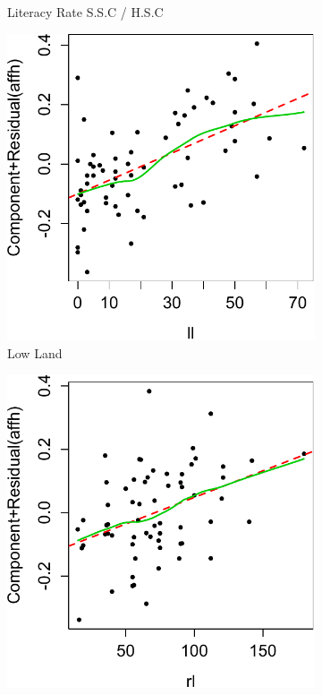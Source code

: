 \documentclass[preprint,review,12pt]{elsarticle}
\begin{document}
\begin{figure}[!htp]
\begin{subfigure}[t]{0.23\textwidth}
\caption{Literacy Rate S.S.C / H.S.C}
\end{subfigure}
\begin{subfigure}[t]{0.23\textwidth}
\centering
\includegraphics[width=\linewidth, keepaspectratio]{ll.pdf}
\caption{Low Land}
\end{subfigure}
\begin{subfigure}[t]{0.23\textwidth}
\centering
\includegraphics[width=\linewidth, keepaspectratio]{rl.pdf}

\end{subfigure}
\end{figure}
\end{document}
